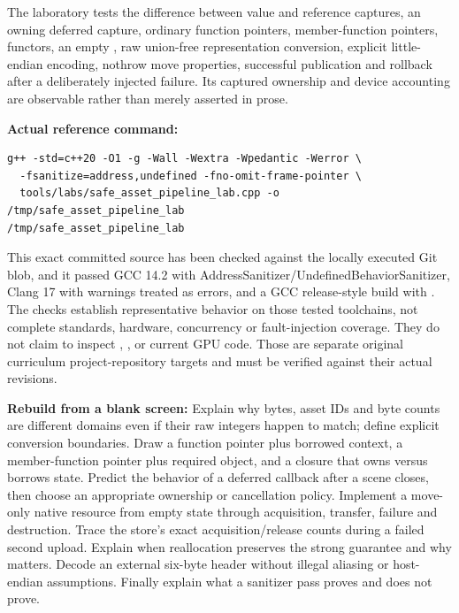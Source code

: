 The laboratory tests the difference between value and reference captures, an owning deferred capture, ordinary function pointers, member-function pointers, functors, an empty , raw union-free representation conversion, explicit little-endian encoding, nothrow move properties, successful publication and rollback after a deliberately injected failure. Its captured ownership and device accounting are observable rather than merely asserted in prose.

\textbf{Actual reference command:}

\begin{verbatim}
g++ -std=c++20 -O1 -g -Wall -Wextra -Wpedantic -Werror \
  -fsanitize=address,undefined -fno-omit-frame-pointer \
  tools/labs/safe_asset_pipeline_lab.cpp -o /tmp/safe_asset_pipeline_lab
/tmp/safe_asset_pipeline_lab
\end{verbatim}

This exact committed source has been checked against the locally executed Git blob, and it passed GCC 14.2 with AddressSanitizer/UndefinedBehaviorSanitizer, Clang 17 with warnings treated as errors, and a GCC release-style build with . The checks establish representative behavior on those tested toolchains, not complete standards, hardware, concurrency or fault-injection coverage. They do not claim to inspect , , or current GPU code. Those are separate original curriculum project-repository targets and must be verified against their actual revisions.

\textbf{Rebuild from a blank screen:} Explain why bytes, asset IDs and byte counts are different domains even if their raw integers happen to match; define explicit conversion boundaries. Draw a function pointer plus borrowed context, a member-function pointer plus required object, and a closure that owns versus borrows state. Predict the behavior of a deferred callback after a scene closes, then choose an appropriate ownership or cancellation policy. Implement a move-only native resource from empty state through acquisition, transfer, failure and destruction. Trace the store's exact acquisition/release counts during a failed second upload. Explain when \BookInlineCode{{v}{e}{c}{t}{o}{r}}{vector} reallocation preserves the strong guarantee and why \BookInlineCode{{n}{o}{e}{x}{c}{e}{p}{t}}{noexcept} matters. Decode an external six-byte header without illegal aliasing or host-endian assumptions. Finally explain what a sanitizer pass proves and does not prove.

